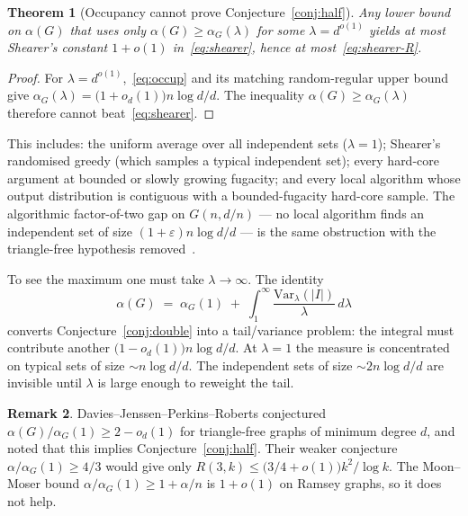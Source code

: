 \documentclass[11pt]{article}
\newtheorem{theorem}{Theorem}
\theoremstyle{definition}
\newtheorem{remark}[theorem]{Remark}
\newcommand{\eps}{\varepsilon}
\newcommand{\Var}{\mathrm{Var}}
\begin{document}
\begin{theorem}[Occupancy cannot prove Conjecture~\ref{conj:half}]\label{thm:barrier}
Any lower bound on $\alpha(G)$ that uses only $\alpha(G)\ge\alpha_G(\lambda)$ for
some $\lambda=d^{o(1)}$ yields at most Shearer's constant $1+o(1)$ in~\eqref{eq:shearer},
hence at most~\eqref{eq:shearer-R}.
\end{theorem}

\begin{proof}
For $\lambda=d^{o(1)}$,~\eqref{eq:occup} and its matching random-regular upper
bound give $\alpha_G(\lambda)=\bigl(1+o_d(1)\bigr)n\log d/d$.
The inequality $\alpha(G)\ge\alpha_G(\lambda)$ therefore cannot beat~\eqref{eq:shearer}.
\end{proof}

This includes: the uniform average over all independent sets ($\lambda=1$);
Shearer's randomised greedy (which samples a typical independent set);
every hard-core argument at bounded or slowly growing fugacity;
and every local algorithm whose output distribution is contiguous with a
bounded-fugacity hard-core sample.
The algorithmic factor-of-two gap on $G(n,d/n)$ --- no local algorithm finds
an independent set of size $(1+\eps)n\log d/d$ --- is the same obstruction
with the triangle-free hypothesis removed~\cite{GS14,RV17}.

To see the maximum one must take $\lambda\to\infty$.
The identity
\begin{equation}\label{eq:var}
  \alpha(G)
  \;=\;
  \alpha_G(1)
  \;+\;
  \int_{1}^{\infty}
  \frac{\Var_{\lambda}(|I|)}{\lambda}\,d\lambda
\end{equation}
converts Conjecture~\ref{conj:double} into a tail/variance problem:
the integral must contribute another $\bigl(1-o_d(1)\bigr)n\log d/d$.
At $\lambda=1$ the measure is concentrated on typical sets of size
$\sim n\log d/d$. The independent sets of size $\sim 2n\log d/d$ are
invisible until $\lambda$ is large enough to reweight the tail.

\begin{remark}
Davies--Jenssen--Perkins--Roberts conjectured $\alpha(G)/\alpha_G(1)\ge 2-o_d(1)$
for triangle-free graphs of minimum degree $d$, and noted that this implies
Conjecture~\ref{conj:half}. Their weaker conjecture $\alpha/\alpha_G(1)\ge 4/3$
would give only $R(3,k)\le\bigl(3/4+o(1)\bigr)k^{2}/\log k$.
The Moon--Moser bound $\alpha/\alpha_G(1)\ge 1+\alpha/n$ is $1+o(1)$ on
Ramsey graphs, so it does not help.
\end{remark}
\end{document}
